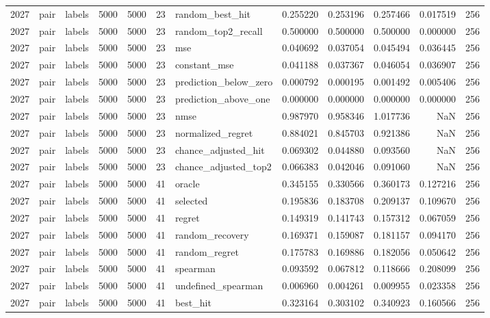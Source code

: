 \begin{tabular}{rllrrrlrrrrr}
2027 & pair & labels & 5000 & 5000 & 23 & random_best_hit & 0.255220 & 0.253196 & 0.257466 & 0.017519 & 256 \\
2027 & pair & labels & 5000 & 5000 & 23 & random_top2_recall & 0.500000 & 0.500000 & 0.500000 & 0.000000 & 256 \\
2027 & pair & labels & 5000 & 5000 & 23 & mse & 0.040692 & 0.037054 & 0.045494 & 0.036445 & 256 \\
2027 & pair & labels & 5000 & 5000 & 23 & constant_mse & 0.041188 & 0.037367 & 0.046054 & 0.036907 & 256 \\
2027 & pair & labels & 5000 & 5000 & 23 & prediction_below_zero & 0.000792 & 0.000195 & 0.001492 & 0.005406 & 256 \\
2027 & pair & labels & 5000 & 5000 & 23 & prediction_above_one & 0.000000 & 0.000000 & 0.000000 & 0.000000 & 256 \\
2027 & pair & labels & 5000 & 5000 & 23 & nmse & 0.987970 & 0.958346 & 1.017736 & NaN & 256 \\
2027 & pair & labels & 5000 & 5000 & 23 & normalized_regret & 0.884021 & 0.845703 & 0.921386 & NaN & 256 \\
2027 & pair & labels & 5000 & 5000 & 23 & chance_adjusted_hit & 0.069302 & 0.044880 & 0.093560 & NaN & 256 \\
2027 & pair & labels & 5000 & 5000 & 23 & chance_adjusted_top2 & 0.066383 & 0.042046 & 0.091060 & NaN & 256 \\
2027 & pair & labels & 5000 & 5000 & 41 & oracle & 0.345155 & 0.330566 & 0.360173 & 0.127216 & 256 \\
2027 & pair & labels & 5000 & 5000 & 41 & selected & 0.195836 & 0.183708 & 0.209137 & 0.109670 & 256 \\
2027 & pair & labels & 5000 & 5000 & 41 & regret & 0.149319 & 0.141743 & 0.157312 & 0.067059 & 256 \\
2027 & pair & labels & 5000 & 5000 & 41 & random_recovery & 0.169371 & 0.159087 & 0.181157 & 0.094170 & 256 \\
2027 & pair & labels & 5000 & 5000 & 41 & random_regret & 0.175783 & 0.169886 & 0.182056 & 0.050642 & 256 \\
2027 & pair & labels & 5000 & 5000 & 41 & spearman & 0.093592 & 0.067812 & 0.118666 & 0.208099 & 256 \\
2027 & pair & labels & 5000 & 5000 & 41 & undefined_spearman & 0.006960 & 0.004261 & 0.009955 & 0.023358 & 256 \\
2027 & pair & labels & 5000 & 5000 & 41 & best_hit & 0.323164 & 0.303102 & 0.340923 & 0.160566 & 256 \\

\end{tabular}
